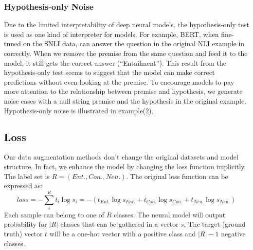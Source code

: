 \subsubsection{Hypothesis-only Noise}

Due to the limited interpretability of deep neural models,
the hypothesis-only test is used as one kind of interpreter for models. 
For example, BERT, when
fine-tuned on the SNLI data, can answer the question in the original NLI example 
in  correctly. 
When we remove the premise from the
same question and feed it to the model, 
it still gets the correct
answer (``Entailment''). 
This result from the hypothesis-only
test seems to suggest that the model can make correct predictions
without even looking at the premise. 
To encourage models to pay more attention to the relationship between premise and hypothesis, 
we generate noise cases with a null string premise and the hypothesis in the original example. 
Hypothesis-only noise is illustrated in  example(2). 

\subsection{Loss}
\label{sec:loss}
Our data augmentation methods don't change the original datasets and model structure. 
In fact, we enhance the model by changing the loss function implicitly. The label set is 
$R=(Ent., Con., Neu.)$.
The original loss function can be expressed as:
 \begin{equation}
 	loss = -\sum_{i}^{R}t_{i}\log s_{i}=-\left ( t_{Ent.}\log s_{Ent.} + t_{Con.}\log s_{Con.} +  t_{Neu.}\log s_{Neu.}\right )
\end{equation}
Each sample can belong to one of  $R$ classes.
 The neural model will output probability for $|R|$ classes that can be gathered in a vector $s$, 
The target (ground truth) vector $t$ will be a one-hot vector with a positive class and $|R|-1$ negative classes.

